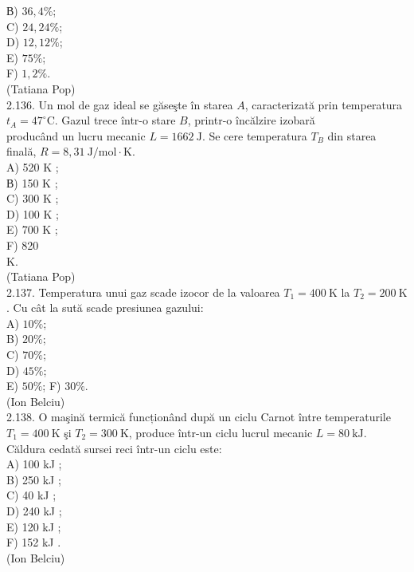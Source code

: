 \documentclass[10pt]{article}
\begin{document}
В) $36,4 \%$;\\
C) $24,24 \%$;\\
D) $12,12 \%$;\\
E) $75 \%$;\\
F) $1,2 \%$.\\
(Tatiana Pop)\\
2.136. Un mol de gaz ideal se găseşte în starea $A$, caracterizată prin temperatura $t_{A}=47^{\circ} \mathrm{C}$. Gazul trece într-o stare $B$, printr-o încălzire izobară\\
producând un lucru mecanic $L=1662 \mathrm{~J}$. Se cere temperatura $T_{B}$ din starea finală, $R=8,31 \mathrm{~J} / \mathrm{mol} \cdot \mathrm{K}$.\\
A) 520 K ;\\
В) 150 K ;\\
C) 300 K ;\\
D) 100 K ;\\
E) 700 K ;\\
F) 820\\
K.\\
(Tatiana Pop)\\
2.137. Temperatura unui gaz scade izocor de la valoarea $T_{1}=400 \mathrm{~K}$ la $T_{2}=200 \mathrm{~K}$. Cu cât la sută scade presiunea gazului:\\
A) $10 \%$;\\
B) $20 \%$;\\
C) $70 \%$;\\
D) $45 \%$;\\
E) $50 \%$; F) $30 \%$.\\
(Ion Belciu)\\
2.138. O maşină termică funcționând după un ciclu Carnot între temperaturile $T_{1}=400 \mathrm{~K}$ şi $T_{2}=300 \mathrm{~K}$, produce într-un ciclu lucrul mecanic $L=80 \mathrm{~kJ}$. Căldura cedată sursei reci într-un ciclu este:\\
A) 100 kJ ;\\
B) 250 kJ ;\\
C) 40 kJ ;\\
D) 240 kJ ;\\
E) 120 kJ ;\\
F) 152 kJ .\\
(Ion Belciu)\\
\end{document}
